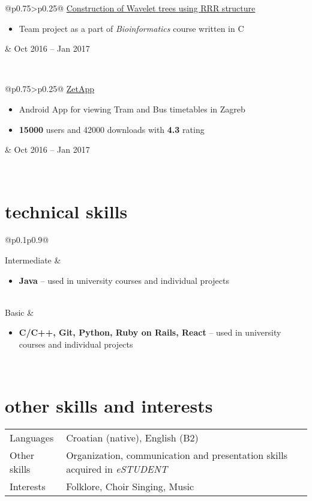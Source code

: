 \documentclass[a4paper]{article}
\makeatletter
\newlength{\tablewidth}
\newenvironment{period}[2]{%
\newcommand{\sarma}{#2}%
\setlength{\tablewidth}{\linewidth}
\addtolength{\tablewidth}{-2\tabcolsep}
\begin{tabular}{@{}p{0.75\tablewidth}>{\raggedleft\arraybackslash}p{0.25\tablewidth}@{}}%
#1 \newline
\begin{itemize}
}{%
\end{itemize} & \sarma \\%
\end{tabular}\\
}
\newenvironment{skills}{%
\setlength{\tablewidth}{\linewidth}
\addtolength{\tablewidth}{-2\tabcolsep}
\setlength{\extrarowheight}{0.2em}
\begin{tabular}{@{}p{0.1\tablewidth}p{0.9\tablewidth}@{}}
}{%
\end{tabular}
}
\makeatother
\begin{document}
\begin{period}{\href{https://github.com/mmagerl/bioinformatics-project}{Construction of Wavelet trees using RRR structure}}{Oct 2016 -- Jan 2017}
	\item 
		Team project as a part of \textit{Bioinformatics} course written in C
\end{period}


\begin{period}{\href{http://tinyurl.com/zetapp}{ZetApp}}{Apr 2015}
	\item Android App for viewing Tram and Bus timetables in Zagreb
	\item \textbf{15000} users and 42000 downloads with \textbf{4.3} rating
\end{period}

\section{technical skills}
\begin{skills}
    Intermediate &
    \begin{itemize}
        \item \textbf{Java} -- used in university courses and individual projects
    \end{itemize} \\
    Basic &
    \begin{itemize}
        \item \textbf{C/C++, Git, Python, Ruby on Rails, React} -- used in university courses and individual projects
    \end{itemize} \\
\end{skills}

\section{other skills and interests}
\begin{skills}
	Languages & Croatian (native), English (B2)  \\
	Other skills & Organization, communication and presentation skills acquired in \textit{eSTUDENT}  \\
    Interests & Folklore, Choir Singing, Music \\
\end{skills}
\end{document}
